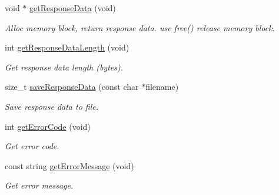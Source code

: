 \begin{DoxyCompactItemize}
\mbox{\label{classHTTPRequest_a7eba8a93c12e96b10765f07e80e2cfaa}} 
void $\ast$ \hyperlink{classHTTPRequest_a7eba8a93c12e96b10765f07e80e2cfaa}{get\+Response\+Data} (void)
\begin{DoxyCompactList}\small\item\em Alloc memory block, return response data. use free() release memory block. \end{DoxyCompactList}\item 
\mbox{\label{classHTTPRequest_a8b2b610418aae5a8e31afe7814864f1a}} 
int \hyperlink{classHTTPRequest_a8b2b610418aae5a8e31afe7814864f1a}{get\+Response\+Data\+Length} (void)
\begin{DoxyCompactList}\small\item\em Get response data length (bytes). \end{DoxyCompactList}\item 
\mbox{\label{classHTTPRequest_a1dce74d188f379996cd791a8a10b846d}} 
size\+\_\+t \hyperlink{classHTTPRequest_a1dce74d188f379996cd791a8a10b846d}{save\+Response\+Data} (const char $\ast$filename)
\begin{DoxyCompactList}\small\item\em Save response data to file. \end{DoxyCompactList}\item 
\mbox{\label{classHTTPRequest_af45a381569bb7d9ce4d0875ec8bfc338}} 
int \hyperlink{classHTTPRequest_af45a381569bb7d9ce4d0875ec8bfc338}{get\+Error\+Code} (void)
\begin{DoxyCompactList}\small\item\em Get error code. \end{DoxyCompactList}\item 
\mbox{\label{classHTTPRequest_a12080984070fb4976be97901d26509ae}} 
const string \hyperlink{classHTTPRequest_a12080984070fb4976be97901d26509ae}{get\+Error\+Message} (void)
\begin{DoxyCompactList}\small\item\em Get error message. \end{DoxyCompactList}\item 
\mbox{\label{classHTTPRequest_a7616a455bd483617a4052f7304acbaa4}} 

\end{DoxyCompactItemize}

